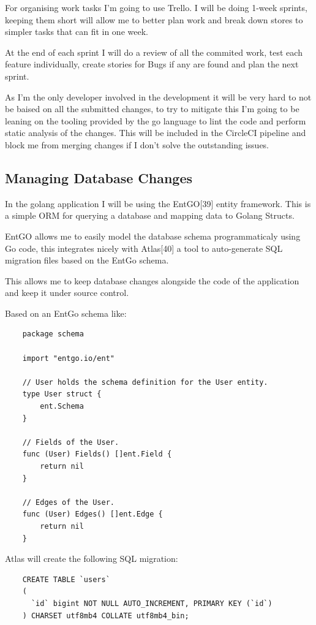 \documentclass{article}
\begin{document}
  For organising work tasks I'm going to use Trello. I will be doing 1-week sprints, keeping them short will allow me to better plan work and break down stores to simpler tasks that can fit in one week.

  At the end of each sprint I will do a review of all the commited work, test each feature individually, create stories for Bugs if any are found and plan the next sprint.

  As I'm the only developer involved in the development it will be very hard to not be baised on all the submitted changes, to try to mitigate this I'm going to be leaning on the tooling provided by the go language to lint the code and perform static analysis of the changes. This will be included in the CircleCI pipeline and block me from merging changes if I don't solve the outstanding issues.

  \subsection{Managing Database Changes}

  In the golang application I will be using the EntGO[39] entity framework. This is a simple ORM for querying a database and mapping data to Golang Structs.

  EntGO allows me to easily model the database schema programmaticaly using Go code, this integrates nicely with Atlas[40] a tool to auto-generate SQL migration files based on the EntGo schema.

  This allows me to keep database changes alongside the code of the application and keep it under source control.

  Based on an EntGo schema like:

  \begin{lstlisting}
    package schema

    import "entgo.io/ent"

    // User holds the schema definition for the User entity.
    type User struct {
        ent.Schema
    }

    // Fields of the User.
    func (User) Fields() []ent.Field {
        return nil
    }

    // Edges of the User.
    func (User) Edges() []ent.Edge {
        return nil
    }
  \end{lstlisting}

  Atlas will create the following SQL migration:

  \begin{lstlisting}
    CREATE TABLE `users` 
    (
      `id` bigint NOT NULL AUTO_INCREMENT, PRIMARY KEY (`id`)
    ) CHARSET utf8mb4 COLLATE utf8mb4_bin;
  \end{lstlisting}
\end{document}
